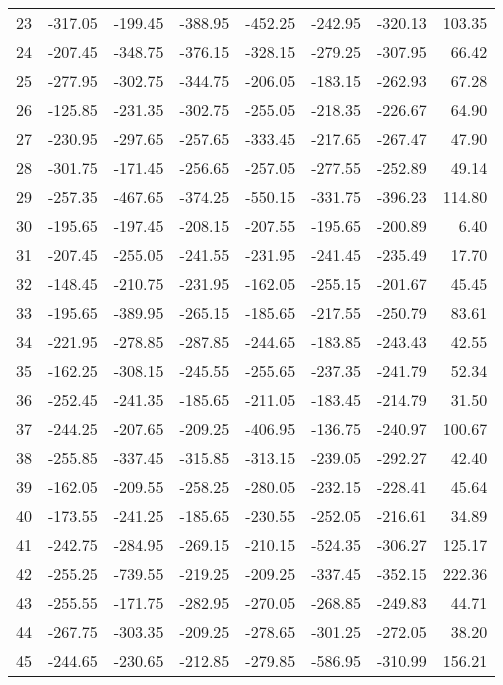 \begin{longtable}{rrrrrrrr}
23 & -317.05 & -199.45 & -388.95 & -452.25 & -242.95 & -320.13 & 103.35  \\
24 & -207.45 & -348.75 & -376.15 & -328.15 & -279.25 & -307.95 & 66.42  \\
25 & -277.95 & -302.75 & -344.75 & -206.05 & -183.15 & -262.93 & 67.28  \\
26 & -125.85 & -231.35 & -302.75 & -255.05 & -218.35 & -226.67 & 64.90  \\
27 & -230.95 & -297.65 & -257.65 & -333.45 & -217.65 & -267.47 & 47.90  \\
28 & -301.75 & -171.45 & -256.65 & -257.05 & -277.55 & -252.89 & 49.14  \\
29 & -257.35 & -467.65 & -374.25 & -550.15 & -331.75 & -396.23 & 114.80  \\
30 & -195.65 & -197.45 & -208.15 & -207.55 & -195.65 & -200.89 & 6.40  \\
31 & -207.45 & -255.05 & -241.55 & -231.95 & -241.45 & -235.49 & 17.70  \\
32 & -148.45 & -210.75 & -231.95 & -162.05 & -255.15 & -201.67 & 45.45  \\
33 & -195.65 & -389.95 & -265.15 & -185.65 & -217.55 & -250.79 & 83.61  \\
34 & -221.95 & -278.85 & -287.85 & -244.65 & -183.85 & -243.43 & 42.55  \\
35 & -162.25 & -308.15 & -245.55 & -255.65 & -237.35 & -241.79 & 52.34  \\
36 & -252.45 & -241.35 & -185.65 & -211.05 & -183.45 & -214.79 & 31.50  \\
37 & -244.25 & -207.65 & -209.25 & -406.95 & -136.75 & -240.97 & 100.67  \\
38 & -255.85 & -337.45 & -315.85 & -313.15 & -239.05 & -292.27 & 42.40  \\
39 & -162.05 & -209.55 & -258.25 & -280.05 & -232.15 & -228.41 & 45.64  \\
40 & -173.55 & -241.25 & -185.65 & -230.55 & -252.05 & -216.61 & 34.89  \\
41 & -242.75 & -284.95 & -269.15 & -210.15 & -524.35 & -306.27 & 125.17  \\
42 & -255.25 & -739.55 & -219.25 & -209.25 & -337.45 & -352.15 & 222.36  \\
43 & -255.55 & -171.75 & -282.95 & -270.05 & -268.85 & -249.83 & 44.71  \\
44 & -267.75 & -303.35 & -209.25 & -278.65 & -301.25 & -272.05 & 38.20  \\
45 & -244.65 & -230.65 & -212.85 & -279.85 & -586.95 & -310.99 & 156.21  \\

\end{longtable}
